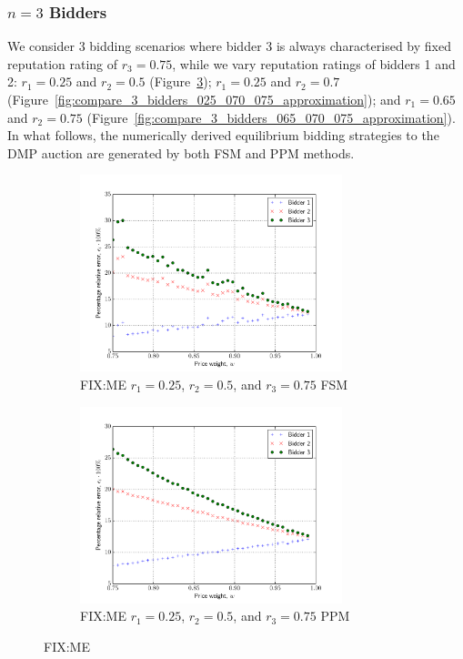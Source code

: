 \subsubsection{$n=3$ Bidders} %
\label{ssub:n_3_bidders_approximation}
We consider 3 bidding scenarios where bidder 3 is always characterised by fixed reputation rating of $r_3=0.75$, while we vary reputation ratings of bidders 1 and 2: $r_1=0.25$ and $r_2=0.5$ (Figure~\ref{fig:compare_3_bidders_025_050_075_approximation}); $r_1=0.25$ and $r_2=0.7$ (Figure~\ref{fig:compare_3_bidders_025_070_075_approximation}); and $r_1=0.65$ and $r_2=0.75$ (Figure~\ref{fig:compare_3_bidders_065_070_075_approximation}). In what follows, the numerically derived equilibrium bidding strategies to the DMP auction are generated by both FSM and PPM methods.

\begin{figure}[p!]
  \begin{subfigure}[b]{0.5\textwidth}
    \includegraphics[width=3in]{Approximation/Figures/compare_3_bidders_025_050_075}
    \caption{FIX:ME $r_1=0.25$, $r_2=0.5$, and $r_3=0.75$ FSM}
    \label{fig:compare_3_bidders_025_050_075_fsm_approximation}
  \end{subfigure}
  \begin{subfigure}[b]{0.5\textwidth}
    \includegraphics[width=3in]{Approximation/Figures/compare_3_bidders_025_050_075_ppm}
    \caption{FIX:ME $r_1=0.25$, $r_2=0.5$, and $r_3=0.75$ PPM}
    \label{fig:compare_3_bidders_025_050_075_ppm_approximation}
  \end{subfigure}
  \caption{FIX:ME}
  \label{fig:compare_3_bidders_025_050_075_approximation}
\end{figure}


